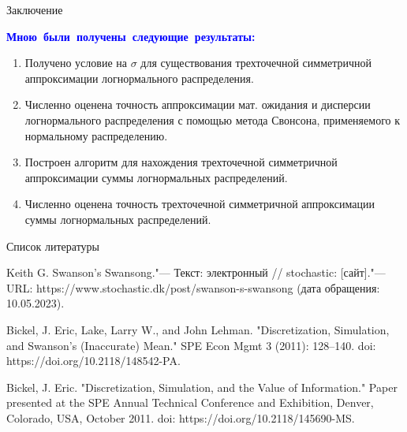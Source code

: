 \documentclass[ucs, notheorems, handout]{beamer}
\begin{document}
	\begin{frame}{Заключение}

		\textcolor{blue}{\hbox{\textbf{Мною были получены следующие результаты:}}}
		\begin{enumerate}
			\item Получено условие на $\sigma$ для существования трехточечной симметричной аппроксимации логнормального распределения.
			\item Численно оценена точность аппроксимации мат. ожидания и дисперсии логнормального распределения с помощью метода Свонсона, применяемого к нормальному распределению.
			\item Построен алгоритм для нахождения трехточечной симметричной аппроксимации суммы логнормальных распределений.
			\item Численно оценена точность трехточечной симметричной аппроксимации суммы логнормальных распределений.
		\end{enumerate}
		
		
	\end{frame}

	\begin{frame}{Список литературы}
		
	\begin{thebibliography}{1}
		 Keith G. Swanson's Swansong."--- Текст: электронный // stochastic: [сайт]."--- URL: https://www.stochastic.dk/post/swanson-s-swansong (дата обращения: 10.05.2023).
		
		 Bickel, J. Eric, Lake, Larry W., and John Lehman. "Discretization, Simulation, and Swanson's (Inaccurate) Mean." SPE Econ Mgmt 3 (2011): 128–140. doi: https://doi.org/10.2118/148542-PA.
		
		 Bickel, J. Eric. "Discretization, Simulation, and the Value of Information." Paper presented at the SPE Annual Technical Conference and Exhibition, Denver, Colorado, USA, October 2011. doi: https://doi.org/10.2118/145690-MS.
		
	\end{thebibliography}
		
		
	\end{frame}
	
	
	
	
\end{document}
